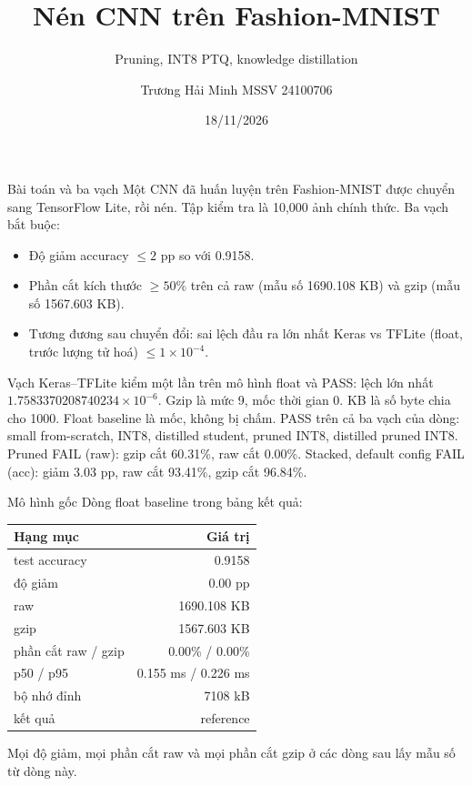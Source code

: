\documentclass[aspectratio=169,11pt]{beamer}
\title{Nén CNN trên Fashion-MNIST}
\subtitle{Pruning, INT8 PTQ, knowledge distillation}
\author{Trương Hải Minh \quad MSSV 24100706}
\date{18/11/2026}
\institute{Trường Đại học Phenikaa \quad Khoa Điện-Điện tử}
\begin{document}
\begin{frame}
  \titlepage
\end{frame}

\begin{frame}{Bài toán và ba vạch}
  Một CNN đã huấn luyện trên Fashion-MNIST được chuyển sang TensorFlow Lite, rồi nén.
  Tập kiểm tra là 10{,}000 ảnh chính thức.
  \vspace{0.35em}
  Ba vạch bắt buộc:
  \begin{itemize}
    \item Độ giảm accuracy \(\le 2\) pp so với 0.9158.
    \item Phần cắt kích thước \(\ge 50\%\) trên cả raw (mẫu số 1690.108 KB) và gzip (mẫu số 1567.603 KB).
    \item Tương đương sau chuyển đổi: sai lệch đầu ra lớn nhất Keras vs TFLite (float, trước lượng tử hoá) \(\le 1\times 10^{-4}\).
  \end{itemize}
  \vspace{0.15em}
  Vạch Keras–TFLite kiểm một lần trên mô hình float và PASS: lệch lớn nhất \(1.7583370208740234\times 10^{-6}\).
  Gzip là mức 9, mốc thời gian 0. KB là số byte chia cho 1000.
  Float baseline là mốc, không bị chấm.
  PASS trên cả ba vạch của dòng: small from-scratch, INT8, distilled student, pruned INT8, distilled pruned INT8.
  Pruned FAIL (raw): gzip cắt 60.31\%, raw cắt 0.00\%.
  Stacked, default config FAIL (acc): giảm 3.03 pp, raw cắt 93.41\%, gzip cắt 96.84\%.
\end{frame}

\begin{frame}{Mô hình gốc}
  Dòng float baseline trong bảng kết quả:
  \begin{center}
  \begin{tabular}{lr}
    \toprule
    Hạng mục & Giá trị \\
    \midrule
    test accuracy & 0.9158 \\
    độ giảm & 0.00 pp \\
    raw & 1690.108 KB \\
    gzip & 1567.603 KB \\
    phần cắt raw / gzip & 0.00\% / 0.00\% \\
    p50 / p95 & 0.155 ms / 0.226 ms \\
    bộ nhớ đỉnh & 7108 kB \\
    kết quả & reference \\
    \bottomrule
  \end{tabular}
  \end{center}
  Mọi độ giảm, mọi phần cắt raw và mọi phần cắt gzip ở các dòng sau lấy mẫu số từ dòng này.
\end{frame}
\end{document}
